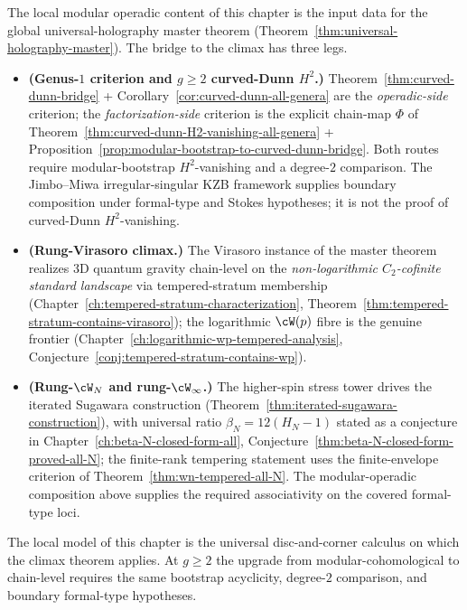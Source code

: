 \begin{remark}[Climax placement: curved-Dunn $H^2 = 0$ feeds the universal holography master]%
\label{rem:modular-operad-climax-placement}%
%
%
%
The local modular operadic content of this chapter is the input
data for the global universal-holography master theorem
(Theorem~\ref{thm:universal-holography-master}). The bridge to the
climax has three legs.
\begin{itemize}[nosep]
\item \textbf{(Genus-$1$ criterion and \(g\ge2\)
curved-Dunn \(H^2\).)}
 Theorem~\ref{thm:curved-dunn-bridge} +
 Corollary~\ref{cor:curved-dunn-all-genera} are the
 \emph{operadic-side} criterion; the \emph{factorization-side}
 criterion is the explicit chain-map $\Phi$ of
 Theorem~\ref{thm:curved-dunn-H2-vanishing-all-genera} +
 Proposition~\ref{prop:modular-bootstrap-to-curved-dunn-bridge}.
 Both routes require modular-bootstrap \(H^2\)-vanishing and a
 degree-\(2\) comparison. The Jimbo--Miwa irregular-singular KZB
 framework supplies boundary composition under formal-type and Stokes
 hypotheses; it is not the proof of curved-Dunn \(H^2\)-vanishing.
\item \textbf{(Rung-Virasoro climax.)} The Virasoro instance of the
 master theorem realizes 3D quantum gravity
 chain-level on the \emph{non-logarithmic $C_2$-cofinite standard
 landscape} via tempered-stratum membership
 (Chapter~\ref{ch:tempered-stratum-characterization},
 Theorem~\ref{thm:tempered-stratum-contains-virasoro}); the
 logarithmic $\cW(p)$ fibre is the genuine frontier
 (Chapter~\ref{ch:logarithmic-wp-tempered-analysis},
 Conjecture~\ref{conj:tempered-stratum-contains-wp}).
\item \textbf{(Rung-$\cW_N$ and rung-$\cW_\infty$.)}
 The higher-spin stress tower drives the iterated Sugawara
 construction
 (Theorem~\ref{thm:iterated-sugawara-construction}), with universal
 ratio $\beta_N = 12(H_N - 1)$ stated as a conjecture in
 Chapter~\ref{ch:beta-N-closed-form-all},
 Conjecture~\ref{thm:beta-N-closed-form-proved-all-N}; the
 finite-rank tempering statement uses the finite-envelope criterion of
 Theorem~\ref{thm:wn-tempered-all-N}. The
 modular-operadic composition above supplies the required
 associativity on the covered formal-type loci.
\end{itemize}
The local model of this chapter is the universal disc-and-corner
calculus on which the climax theorem applies. At $g \ge 2$ the
upgrade from modular-cohomological to chain-level requires
the same bootstrap acyclicity, degree-\(2\) comparison, and boundary
formal-type hypotheses.
\end{remark}

